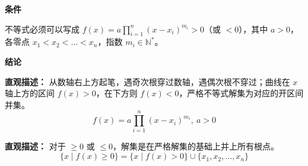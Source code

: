 \begin{statementbox}

	\textbf{\textcolor{CStatement}{条件}}
	\begin{description}[style=nextline, leftmargin=2.8em, labelsep=0.5em, itemsep=0.35em]
		\item[\textbf{\textcolor{CStatement}{条件 1（可化标准形式）：}}] 不等式必须可以写成 $f(x) = a\prod_{i=1}^{n}(x-x_i)^{m_i} > 0$（或 $<0$），其中 $a > 0$，各零点 $x_1 < x_2 < \dots < x_n$，指数 $m_i \in \mathbb{N}^*$。
	\end{description}

	\textbf{\textcolor{CStatement}{结论}}
	\begin{description}[style=nextline, leftmargin=2.8em, labelsep=0.5em, itemsep=0.45em]
		\item[\textbf{\textcolor{CStatement}{结论一（奇穿偶不穿规则）：}}]
			\textbf{\textcolor{CStatement}{直观描述：}}
			从数轴右上方起笔，遇奇次根穿过数轴，遇偶次根不穿过；曲线在 $x$ 轴上方的区间 $f(x)>0$，在下方则 $f(x)<0$，严格不等式解集为对应的开区间并集。
			\[
				f(x) = a\prod_{i=1}^{n}(x-x_i)^{m_i},\ a>0
			\]

		\item[\textbf{\textcolor{CStatement}{推广结论（非严格处理）：}}]
			\textbf{\textcolor{CStatement}{直观描述：}}
			对于 $\geq 0$ 或 $\leq 0$，解集是在严格解集的基础上并上所有根点。
			\[
				\{x\mid f(x)\geq 0\} = \{x\mid f(x)>0\} \cup \{x_1,x_2,\dots,x_n\}
			\]
	\end{description}

\end{statementbox}
